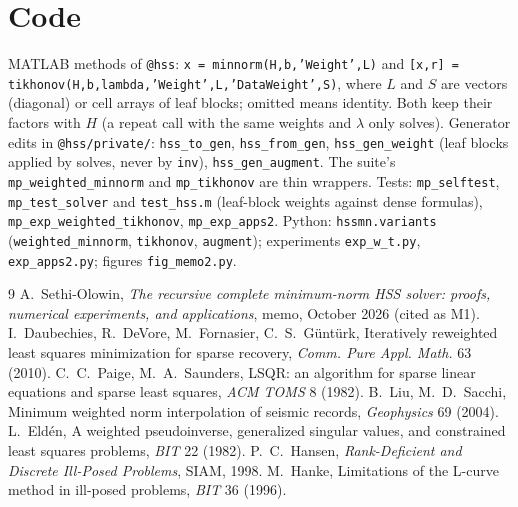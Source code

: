 \documentclass[11pt]{article}
\theoremstyle{remark}
\begin{document}
\appendix
\section{Code}
\sloppy
MATLAB methods of \texttt{@hss}: \texttt{x = minnorm(H,b,'Weight',L)} and
\texttt{[x,r] = tikhonov(H,b,lambda,'Weight',L,'DataWeight',S)}, where $L$ and $S$ are vectors (diagonal)
or cell arrays of leaf blocks; omitted means identity. Both keep their factors with $H$ (a repeat call with
the same weights and $\lambda$ only solves). Generator edits in \texttt{@hss/private/}: \texttt{hss\_to\_gen},
\texttt{hss\_from\_gen}, \texttt{hss\_gen\_weight} (leaf blocks applied by solves, never by \texttt{inv}),
\texttt{hss\_gen\_augment}. The suite's \texttt{mp\_weighted\_minnorm} and \texttt{mp\_tikhonov} are thin
wrappers. Tests: \texttt{mp\_selftest}, \texttt{mp\_test\_solver} and \texttt{test\_hss.m} (leaf-block weights
against dense formulas), \texttt{mp\_exp\_weighted\_tikhonov}, \texttt{mp\_exp\_apps2}. Python: \texttt{hssmn.variants}
(\texttt{weighted\_minnorm}, \texttt{tikhonov}, \texttt{augment}); experiments \texttt{exp\_w\_t.py},
\texttt{exp\_apps2.py}; figures \texttt{fig\_memo2.py}.

\begin{thebibliography}{9}\small
{} A.~Sethi-Olowin, \emph{The recursive complete minimum-norm HSS solver: proofs,
numerical experiments, and applications}, memo, October 2026 (cited as M1).
 I.~Daubechies, R.~DeVore, M.~Fornasier, C.~S.~G\"unt\"urk, Iteratively reweighted least
squares minimization for sparse recovery, \emph{Comm. Pure Appl. Math.} 63 (2010).
 C.~C.~Paige, M.~A.~Saunders, LSQR: an algorithm for sparse linear equations and sparse
least squares, \emph{ACM TOMS} 8 (1982).
 B.~Liu, M.~D.~Sacchi, Minimum weighted norm interpolation of seismic records,
\emph{Geophysics} 69 (2004).
 L.~Eld\'en, A weighted pseudoinverse, generalized singular values, and constrained
least squares problems, \emph{BIT} 22 (1982).
 P.~C.~Hansen, \emph{Rank-Deficient and Discrete Ill-Posed Problems}, SIAM, 1998.
 M.~Hanke, Limitations of the L-curve method in ill-posed problems, \emph{BIT} 36 (1996).
\end{thebibliography}
\end{document}
